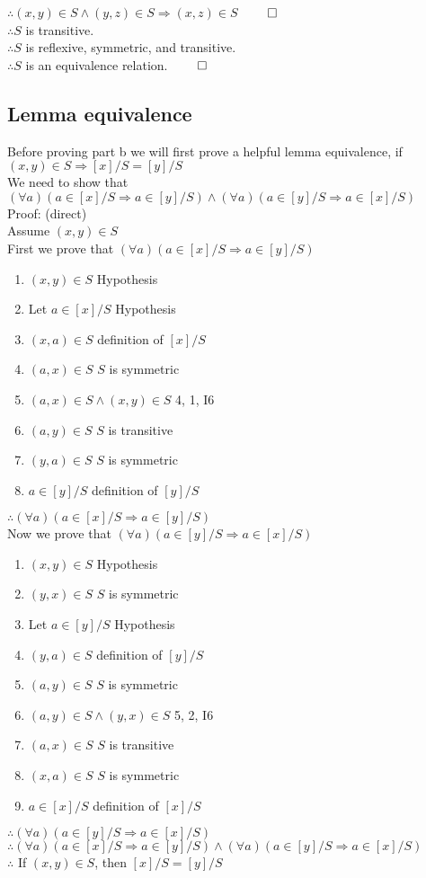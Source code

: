 \documentclass{article}
\begin{document}
			$\therefore (x, y) \in S \land (y, z) \in S \Rightarrow (x, z) \in S$ \hfill $\qed$ \\
			$\therefore S$ is transitive. \\
			$\therefore S$ is reflexive, symmetric, and transitive. \\
			$\therefore S$ is an equivalence relation. \hfill $\qed$ 
		\subsection {Lemma equivalence}
			Before proving part b we will first prove a helpful lemma equivalence, if $(x, y) \in S \Rightarrow [x]/S = [y]/S$ \\
			We need to show that $(\forall a)(a \in [x]/S \Rightarrow a \in [y]/S) \land (\forall a)(a \in [y]/S \Rightarrow a \in [x]/S)$ \\
			Proof: (direct) \\
			Assume $(x, y) \in S$ \\
			First we prove that $(\forall a)(a \in [x]/S \Rightarrow a \in [y]/S)$
			\begin{enumerate}
				\item $(x, y) \in S$ \hfill Hypothesis
				\item Let $a \in [x]/S$ \hfill Hypothesis
				\item $(x, a) \in S$ \hfill definition of $[x]/S$
				\item $(a, x) \in S$ \hfill $S$ is symmetric
				\item $(a, x) \in S \land (x, y) \in S$ \hfill 4, 1, I6
				\item $(a, y) \in S$ \hfill $S$ is transitive
				\item $(y, a) \in S$ \hfill $S$ is symmetric
				\item $a \in [y]/S$ \hfill definition of $[y]/S$
			\end{enumerate}
			$\therefore (\forall a)(a \in [x]/S \Rightarrow a \in [y]/S)$ \\
			Now we prove that $(\forall a)(a \in [y]/S \Rightarrow a \in [x]/S)$
			\begin{enumerate}
				\item $(x, y) \in S$ \hfill Hypothesis
				\item $(y, x) \in S$ \hfill $S$ is symmetric
				\item Let $a \in [y]/S$ \hfill Hypothesis
				\item $(y, a) \in S$ \hfill definition of $[y]/S$
				\item $(a, y) \in S$ \hfill $S$ is symmetric
				\item $(a, y) \in S \land (y, x) \in S$ \hfill  5, 2, I6
				\item $(a, x) \in S$ \hfill $S$ is transitive
				\item $(x, a) \in S$ \hfill $S$ is symmetric
				\item $a \in [x]/S$ \hfill definition of $[x]/S$
			\end{enumerate}
			$\therefore (\forall a)(a \in [y]/S \Rightarrow a \in [x]/S)$ \\
			$\therefore (\forall a)(a \in [x]/S \Rightarrow a \in [y]/S) \land (\forall a)(a \in [y]/S \Rightarrow a \in [x]/S)$ \\
			$\therefore$ If $(x, y) \in S$, then $[x]/S = [y]/S$
\end{document}
